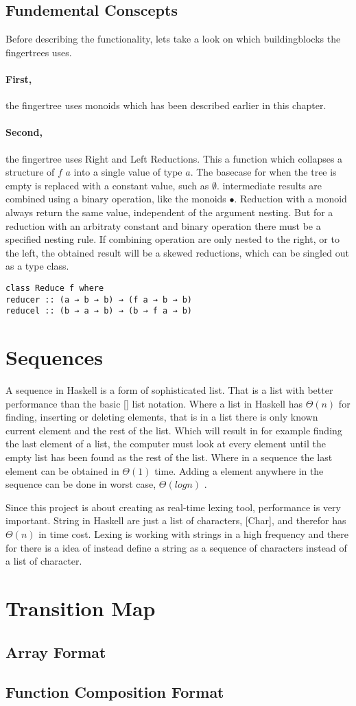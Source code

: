 \subsection{Fundemental Conscepts}
Before describing the functionality, lets take a look on which buildingblocks the fingertrees uses.
\paragraph{First,}
the fingertree uses monoids which has been described earlier in this chapter.
\paragraph{Second,} 
the fingertree uses Right and Left Reductions. This a function which collapses a structure of $f$ $a$ into
a single value of type $a$. The basecase for when the tree is empty is replaced with a constant value, such as
$\emptyset$. intermediate results are combined using a binary operation, like the monoids $\bullet$.
Reduction with a monoid always return the same value, independent of the argument nesting. But for a reduction with 
an arbitraty constant and binary operation there must be a specified nesting rule. 
If combining operation are only nested to the right, or to the
left, the obtained result will be a skewed reductions, which can be singled out as a type class.
\begin{verbatim}
class Reduce f where
reducer :: (a → b → b) → (f a → b → b)
reducel :: (b → a → b) → (b → f a → b)
\end{verbatim}
\cite{fingertree}

\section{Sequences}
A sequence in Haskell is a form of sophisticated list. That is a list with better performance than the basic [] list notation. Where a list in Haskell has $\Theta(n)$ for finding, inserting or deleting elements, that is in a list there is only known current element and the rest of the list. Which will result in for example finding the last element of a list, the computer must look at every element until the empty list has been found as the rest of the list. Where in a sequence the last element can be obtained in $\Theta(1)$ time. Adding a element anywhere in the sequence can be done in worst case, $\Theta(log n)$ \cite{fingertree}. 

Since this project is about creating as real-time lexing tool, performance is very important. String in Haskell are just a list of characters, [Char], and therefor has $\Theta(n)$ in time cost. Lexing is working with strings in a high frequency and there for there is a idea of instead define a string as a sequence of characters instead of a list of character. 

\section{Transition Map}
\subsection{Array Format}
\subsection{Function Composition Format}
